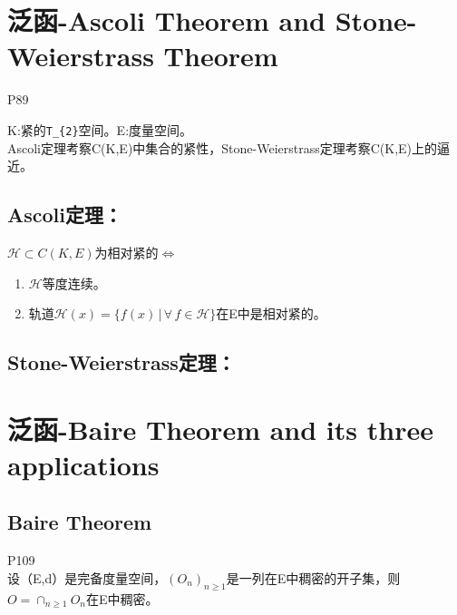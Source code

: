 \documentclass[
]{article}
\author{}
\date{}
\begin{document}
\hypertarget{ux6cdbux51fd-ascoli-theorem-and-stone-weierstrass-theorem}{%
\section{泛函-Ascoli Theorem and Stone-Weierstrass
Theorem}\label{ux6cdbux51fd-ascoli-theorem-and-stone-weierstrass-theorem}}

P89

K:紧的\texttt{T\_\{2\}}空间。E:度量空间。\\
Ascoli定理考察C(K,E)中集合的紧性，Stone-Weierstrass定理考察C(K,E)上的逼近。

\hypertarget{ascoliux5b9aux7406}{%
\subsection{\texorpdfstring{\textbf{Ascoli定理：}}{Ascoli定理：}}\label{ascoliux5b9aux7406}}

\(\mathcal H\subset C(K,E)\)为相对紧的\(\Leftrightarrow\)

\begin{enumerate}
\def\labelenumi{\arabic{enumi}.}
\item
  \(\mathcal H\)等度连续。
\item
  轨道\(\mathcal H(x)=\{f(x)\,|\,\forall \, f\in \mathcal H \}\)在E中是相对紧的。
\end{enumerate}

\hypertarget{stone-weierstrassux5b9aux7406}{%
\subsection{\texorpdfstring{\textbf{Stone-Weierstrass定理：}}{Stone-Weierstrass定理：}}\label{stone-weierstrassux5b9aux7406}}

\hypertarget{ux6cdbux51fd-baire-theorem-and-its-three-applications}{%
\section{泛函-Baire Theorem and its three
applications}\label{ux6cdbux51fd-baire-theorem-and-its-three-applications}}

\hypertarget{baire-theorem}{%
\subsection{Baire Theorem}\label{baire-theorem}}

P109\\
设（E,d）是完备度量空间，\((O_{n})_{n\geq 1}\)是一列在E中稠密的开子集，则\(O=\cap_{n\geq 1}O_{n}\)在E中稠密。
\end{document}
